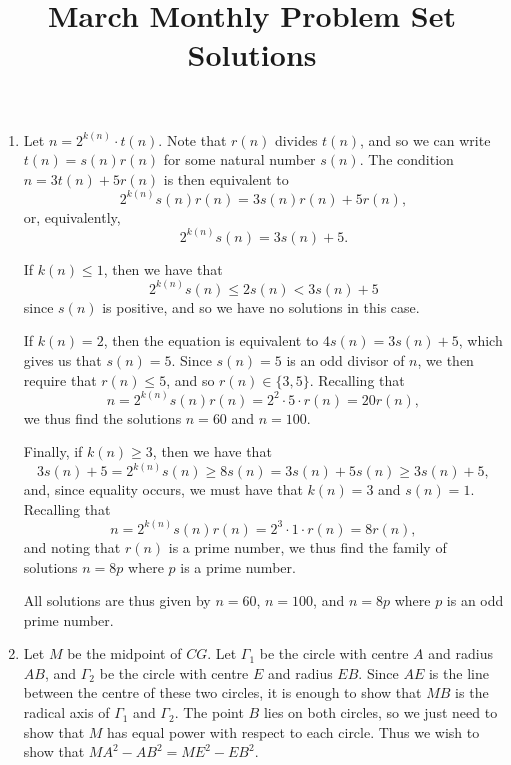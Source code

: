 \documentclass[12pt]{article}
\title{\vspace{-24pt}March Monthly Problem Set Solutions}
\author{\vspace{-24pt}}
\date{\vspace{-24pt}}
\begin{document}
 \maketitle \pagestyle{empty}

\begin{enumerate}

\item %
Let $n = 2^{k(n)} \cdot t(n)$. Note that $r(n)$ divides $t(n)$, and so we can
write $t(n) = s(n) r(n)$ for some natural number $s(n)$. The condition $n =
3t(n) + 5r(n)$ is then equivalent to
\[
    2^{k(n)} s(n) r(n) = 3 s(n) r(n) + 5r(n),
\]
or, equivalently,
\[
    2^{k(n)} s(n) = 3s(n) + 5.
\]

If $k(n) \leq 1$, then we have that
\[
    2^{k(n)} s(n) \leq 2s(n) < 3s(n) + 5
\]
since $s(n)$ is positive, and so we have no solutions in this case.

If $k(n) = 2$, then the equation is equivalent to $4s(n) = 3s(n) + 5$, which
gives us that $s(n) = 5$. Since $s(n) = 5$ is an odd divisor of $n$, we then
require that $r(n) \leq 5$, and so $r(n) \in \{3, 5\}$. Recalling that
\[
    n = 2^{k(n)} s(n) r(n) = 2^2 \cdot 5 \cdot r(n) = 20 r(n),
\]
we thus find the solutions $n = 60$ and $n = 100$.

Finally, if $k(n) \geq 3$, then we have that
\[
    3s(n) + 5 = 2^{k(n)} s(n) \geq 8 s(n) = 3s(n) + 5s(n) \geq 3s(n) + 5,
\]
and, since equality occurs, we must have that $k(n) = 3$ and $s(n) = 1$.
Recalling that
\[
    n = 2^{k(n)} s(n) r(n) = 2^3 \cdot 1 \cdot r(n) = 8r(n),
\]
and noting that $r(n)$ is a prime number, we thus find the family of solutions
$n = 8p$ where $p$ is a prime number.

All solutions are thus given by $n = 60$, $n = 100$, and $n = 8p$ where $p$ is
an odd prime number.


\item %
Let $M$ be the midpoint of $CG$. Let $\Gamma_1$ be the circle with centre $A$
and radius $AB$, and $\Gamma_2$ be the circle with centre $E$ and radius $EB$.
Since $AE$ is the line between the centre of these two circles, it is enough to
show that $MB$ is the radical axis of $\Gamma_1$ and $\Gamma_2$. The point $B$
lies on both circles, so we just need to show that $M$ has equal power with
respect to each circle. Thus we wish to show that $MA^2 - AB^2 = ME^2 - EB^2$.


\end{enumerate}
\end{document}
